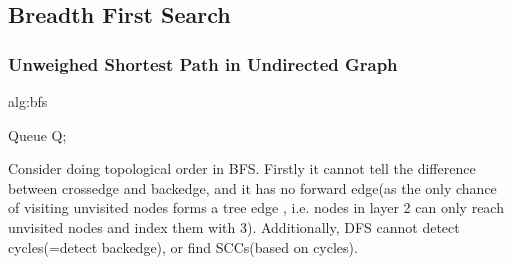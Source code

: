 \subsection{Breadth First Search}
\subsubsection{Unweighed Shortest Path in Undirected Graph}
\begin{algorithm}
    \caption{alg:bfs}
    \label{Naive BFS}
    Queue Q;\\
\end{algorithm}

Consider doing topological order in BFS. 
Firstly it cannot tell the difference between crossedge and backedge, and it has no forward edge(as the only chance of visiting unvisited nodes forms a tree edge
, i.e. nodes in layer 2 can only reach unvisited nodes and index them with 3).
Additionally, DFS cannot detect cycles(=detect backedge), or find SCCs(based on cycles).


